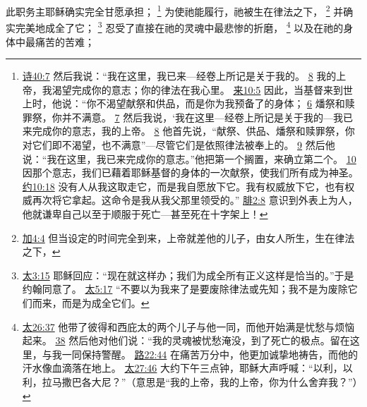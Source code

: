 \documentclass[12pt, a4paper, oneside]{ctexart}
\newcounter{parnum}[section]
\newcommand{\N}{%
   \noindent\refstepcounter{parnum}%
    \makebox[\parindent][l]{\textbf{\arabic{parnum}.}}}
\begin{document}
\N 此职务主耶稣确实完全甘愿承担；
	\footnote {
		\href{https://biblehub.com/psalms/40-7.htm}{诗40:7} 然后我说：“我在这里，我已来---经卷上所记是关于我的。
		\href{https://biblehub.com/psalms/40-8.htm}{8} 我的上帝，我渴望完成你的意志；你的律法在我心里。
		\href{https://biblehub.com/hebrews/10-5.htm}{来10:5} 因此，当基督来到世上时，他说：“你不渴望献祭和供品，而是你为我预备了的身体；
		\href{https://biblehub.com/hebrews/10-6.htm}{6} 燔祭和赎罪祭，你并不满意。
		\href{https://biblehub.com/hebrews/10-7.htm}{7} 然后我说，‘我在这里---经卷上所记是关于我的---我已来完成你的意志，我的上帝。
		\href{https://biblehub.com/hebrews/10-8.htm}{8} 他首先说，“献祭、供品、燔祭和赎罪祭，你对它们即不渴望，也不满意”---尽管它们是依照律法被奉上的。
		\href{https://biblehub.com/hebrews/10-9.htm}{9} 然后他说：“我在这里，我已来完成你的意志。”他把第一个搁置，来确立第二个。
		\href{https://biblehub.com/hebrews/10-10.htm}{10} 因那个意志，我们已藉着耶稣基督的身体的一次献祭，使我们所有成为神圣。
		\href{https://biblehub.com/john/10-18.htm}{约10:18} 没有人从我这取走它，而是我自愿放下它。我有权威放下它，也有权威再次将它拿起。这命令是我从我父那里领受的。”
		\href{https://biblehub.com/philippians/2-8.htm}{腓2:8} 意识到外表上为人，他就谦卑自己以至于顺服于死亡---甚至死在十字架上！
	}
	为使祂能履行，祂被生在律法之下，
	\footnote {
		\href{https://biblehub.com/galatians/4-4.htm}{加4:4} 但当设定的时间完全到来，上帝就差他的儿子，由女人所生，生在律法之下，
	}
	并确实完美地成全了它；
	\footnote {
		\href{https://biblehub.com/matthew/3-15.htm}{太3:15} 耶稣回应：“现在就这样办；我们为成全所有正义这样是恰当的。”于是约翰同意了。
		\href{https://biblehub.com/matthew/5-17.htm}{太5:17} “不要以为我来了是要废除律法或先知；我不是为废除它们而来，而是为成全它们。
	}
	忍受了直接在祂的灵魂中最悲惨的折磨，
	\footnote {
		\href{https://biblehub.com/matthew/26-37.htm}{太26:37} 他带了彼得和西庇太的两个儿子与他一同，而他开始满是忧愁与烦恼起来。
		\href{https://biblehub.com/matthew/26-38.htm}{38} 然后他对他们说：“我的灵魂被忧愁淹没，到了死亡的极点。留在这里，与我一同保持警醒。
		\href{https://biblehub.com/luke/22-44.htm}{路22:44} 在痛苦万分中，他更加诚挚地祷告，而他的汗水像血滴落在地上。
		\href{https://biblehub.com/matthew/27-46.htm}{太27:46} 大约下午三点钟，耶稣大声呼喊：“以利，以利，拉马撒巴各大尼？”（意思是“我的上帝，我的上帝，你为什么舍弃我？”）
	}
	以及在祂的身体中最痛苦的苦难；
\end{document}
